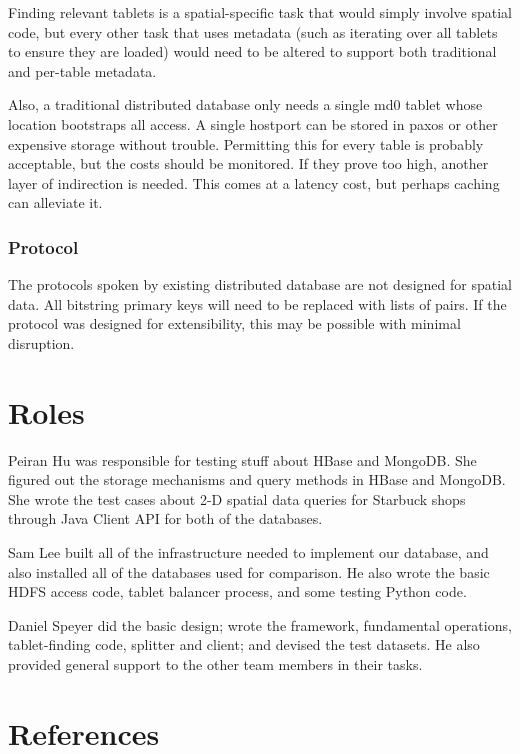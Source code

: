 \documentclass[11pt]{article}
\begin{document}
Finding relevant tablets is a spatial-specific task that would simply involve spatial code, but every other task that uses metadata (such as iterating over all tablets to ensure they are loaded) would need to be altered to support both traditional and per-table metadata.

Also, a traditional distributed database only needs a single md0 tablet whose location bootstraps all access.  A single hostport can be stored in paxos or other expensive storage without trouble.  Permitting this for every table is probably acceptable, but the costs should be monitored.  If they prove too high, another layer of indirection is needed.  This comes at a latency cost, but perhaps caching can alleviate it.

\subsubsection{Protocol}

The protocols spoken by existing distributed database are not designed for spatial data.  All bitstring primary keys will need to be replaced with lists of pairs.  If the protocol was designed for extensibility, this may be possible with minimal disruption.

\section{Roles}

Peiran Hu was responsible for testing stuff about HBase and MongoDB. She figured out the storage mechanisms and query methods in HBase and MongoDB. She wrote the test cases about 2-D spatial data queries for Starbuck shops through Java Client API for both of the databases.

Sam Lee built all of the infrastructure needed to implement our database, and also installed all of the databases used for comparison. He also wrote the basic HDFS access code, tablet balancer process, and some testing Python code. 

Daniel Speyer did the basic design; wrote the framework, fundamental operations, tablet-finding code, splitter and client; and devised the test datasets.  He also provided general support to the other team members in their tasks.

\section{References}
\end{document}
